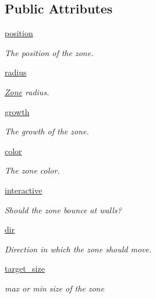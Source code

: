 \subsection*{\-Public \-Attributes}
\begin{DoxyCompactItemize}
\item 
\hyperlink{class_zone_1_1_zone_a5f5682287ad00b6437fd781c64243a72}{position}
\begin{DoxyCompactList}\small\item\em \-The position of the zone. \end{DoxyCompactList}\item 
\hyperlink{class_zone_1_1_zone_a537406dc6f09d6f6d38ab88b752af1ea}{radius}
\begin{DoxyCompactList}\small\item\em \hyperlink{class_zone_1_1_zone}{\-Zone} radius. \end{DoxyCompactList}\item 
\hyperlink{class_zone_1_1_zone_a12ac29a7558642104103da15eed1000b}{growth}
\begin{DoxyCompactList}\small\item\em \-The growth of the zone. \end{DoxyCompactList}\item 
\hyperlink{class_zone_1_1_zone_ad85f29e8e56e3d8eba3faa0e796faef0}{color}
\begin{DoxyCompactList}\small\item\em \-The zone color. \end{DoxyCompactList}\item 
\hyperlink{class_zone_1_1_zone_ac733124dafd015bfc3fc28c291b22373}{interactive}
\begin{DoxyCompactList}\small\item\em \-Should the zone bounce at walls? \end{DoxyCompactList}\item 
\hyperlink{class_zone_1_1_zone_a1b25df718a504fc19668f15a0e41df8f}{dir}
\begin{DoxyCompactList}\small\item\em \-Direction in which the zone should move. \end{DoxyCompactList}\item 
\hyperlink{class_zone_1_1_zone_a8cae307a50884aa846a8986e9cc9cca6}{target\-\_\-size}
\begin{DoxyCompactList}\small\item\em max or min size of the zone \end{DoxyCompactList}\item 

\end{DoxyCompactItemize}
